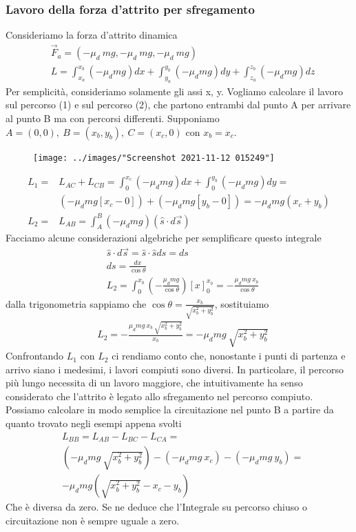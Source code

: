 \documentclass[10pt,a4paper]{article}
\begin{document}
\subsubsection{Lavoro della forza d'attrito per sfregamento}
Consideriamo la forza d'attrito dinamica 
\begin{align*}
	&\vec{F}_a = (-\mu_d\ mg,-\mu_d\ mg,-\mu_d\ mg)\\ 
	&L =  \int_{x_a}^{x_b}(-\mu_d mg) dx +\int_{y_a}^{y_b}(-\mu_d mg) dy+\int_{z_a}^{z_b}(-\mu_d mg) dz
\end{align*}
Per semplicità, consideriamo solamente gli assi x, y. Vogliamo calcolare il lavoro sul percorso (1) e sul percorso (2), che partono entrambi dal punto A per arrivare al punto B ma con percorsi differenti. Supponiamo $A = (0,0),\ B = (x_b,y_b),\ C= (x_c,0)$ con $x_b = x_c$.
\begin{figure}[h]
	\centering
	\texttt{[image: ../images/"Screenshot 2021-11-12 015249"]}
	\label{fig:screenshot-2021-11-12-015249}
\end{figure}\FloatBarrier
\begin{align*}
L_1 =& L_{AC}+L_{CB} = \int_{0}^{x_c} (-\mu_d mg) dx + \int_{0}^{y_b} (-\mu_d mg) dy=\\
&(-\mu_d mg [x_c-0])+(-\mu_d mg [y_b-0]) = -\mu_d mg(x_c+y_b)\\
L_2 =& L_{AB} = \int_{A}^{B}(-\mu_d mg) (\hat{s} \cdot d\vec{s}) 
\end{align*}
Facciamo alcune considerazioni algebriche per semplificare questo integrale
\begin{align*}
&\hat{s}\cdot d\vec{s}= \hat{s}\cdot \hat{s} ds = ds\\
& ds =\frac{dx}{\cos\theta}\\
&L_2 = \int_{0}^{x_b}(-\frac{\mu_d mg}{\cos\theta}) [x]_{0}^{x_b}=-\frac{\mu_d mg\ x_b}{\cos\theta}
\end{align*}
dalla trigonometria sappiamo che $\cos\theta= \frac{x_b}{\sqrt{x_b^2+y_b^2}}$, sostituiamo
\begin{align*}
&L_2 = -\frac{\mu_d mg\ x_b\ \sqrt{x_b^2+y_b^2}}{x_b} = -\mu_d mg\ \sqrt{x_b^2+y_b^2} 
\end{align*}
Confrontando $L_1$ con $L_2$ ci rendiamo conto che, nonostante i punti di partenza e arrivo siano i medesimi, i lavori compiuti sono diversi. In particolare, il percorso più lungo necessita di un lavoro maggiore, che intuitivamente ha senso considerato che l'attrito è legato allo sfregamento nel percorso compiuto. Possiamo calcolare in modo semplice la circuitazione nel punto B a partire da quanto trovato negli esempi appena svolti
\begin{align*}
&L_{BB} = L_{AB}-L_{BC}-L_{CA}=\\
&(-\mu_d mg\ \sqrt{x_b^2+y_b^2}) - (-\mu_d mg\ x_c) - (-\mu_d mg\ y_b)=\\
&-\mu_d mg(\sqrt{x_b^2+y_b^2}-x_c-y_b)
\end{align*}
Che è diversa da zero. Se ne deduce che l'Integrale su percorso chiuso o circuitazione non è sempre uguale a zero.
\end{document}
